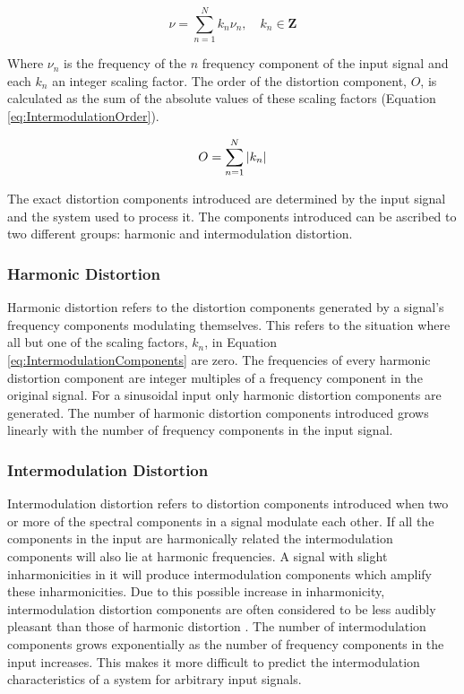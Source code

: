 		\begin{equation}
			\nu = \sum_{n = 1}^{N} k_{n}\nu_{n}, \quad k_{n} \in \textbf{Z}
			\label{eq:IntermodulationComponents}
		\end{equation}

		Where $\nu_{n}$ is the frequency of the $n$ frequency component of the input signal and each
		$k_{n}$ an integer scaling factor. The order of the distortion component, $O$, is calculated as the sum of
		the absolute values of these scaling factors (Equation \ref{eq:IntermodulationOrder}).

		\begin{equation}
			O = \sum_{n = 1}^{N} \left|k_{n}\right|
			\label{eq:IntermodulationOrder}
		\end{equation}

		The exact distortion components introduced are determined by the input signal and the system used to
		process it. The components introduced can be ascribed to two different groups: harmonic and intermodulation
		distortion.

		\subsubsection*{Harmonic Distortion}
			Harmonic distortion refers to the distortion components generated by a signal's frequency
			components modulating themselves. This refers to the situation where all but one of the scaling
			factors, $k_{n}$, in Equation \ref{eq:IntermodulationComponents} are zero. The frequencies of every
			harmonic distortion component are integer multiples of a frequency component in the original
			signal. For a sinusoidal input only harmonic distortion components are generated. The number of
			harmonic distortion components introduced grows linearly with the number of frequency components in
			the input signal.

		\subsubsection*{Intermodulation Distortion}
			Intermodulation distortion refers to distortion components introduced when two or more of the
			spectral components in a signal modulate each other. If all the components in the input are
			harmonically related the intermodulation components will also lie at harmonic frequencies. A signal
			with slight inharmonicities in it will produce intermodulation components which amplify these
			inharmonicities. Due to this possible increase in inharmonicity, intermodulation distortion
			components are often considered to be less audibly pleasant than those of harmonic distortion
			\citep{rumsey2009sound}. The number of intermodulation components grows exponentially as the number
			of frequency components in the input increases. This makes it more difficult to predict the
			intermodulation characteristics of a system for arbitrary input signals.

